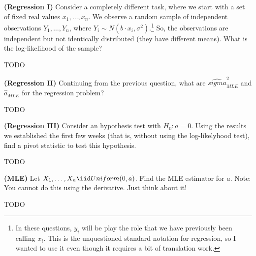
\textbf{(Regression I)} Consider a completely different task, where we start
with a set of fixed real values $x_1, \ldots, x_n$. We observe a random
sample of independent observations $Y_1, \ldots, Y_n$, where
$Y_i \sim N(b \cdot x_i, \sigma^2)$.\footnote{
  In these questions, $y_i$ will be play the role that we have previously
  been calling $x_i$. This is the unquestioned standard notation for regression,
  so I wanted to use it even though it requires a bit of translation work.
} So, the observations are independent but not identically distributed (they
have different means). What is the log-likelihood of the sample?


TODO



\textbf{(Regression II)} Continuing from the previous question, what are
$\hat{sigma}_{MLE}^2$ and $\hat{a}_{MLE}$ for the regression problem?


TODO


\textbf{(Regression III)} Consider an hypothesis test with $H_0: a = 0$. 
Using the results we established the first few weeks (that is, without using the
log-likelyhood test), find a pivot statistic to test this hypothesis. 


TODO


\textbf{(MLE)} Let $X_1, \ldots, X_n \iid Uniform(0, a)$. Find the MLE estimator
for $a$. Note: You cannot do this using the derivative. Just think about it!


TODO
